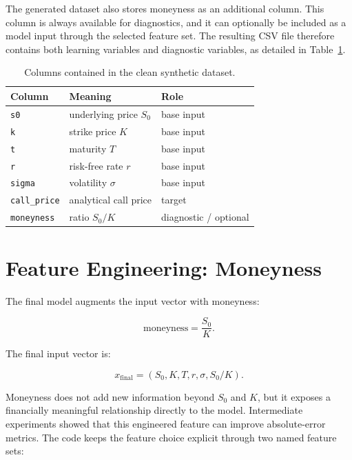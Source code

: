 The generated dataset also stores moneyness as an additional column.
This column is always available for diagnostics, and it can optionally be included as a model input through the selected feature set.
The resulting CSV file therefore contains both learning variables and diagnostic variables, as detailed in Table~\ref{tab:dataset-columns}.

\begin{table}[H]
    \centering
    \begin{tabular}{lll}
        \toprule
        Column & Meaning & Role \\
        \midrule
        \texttt{s0} & underlying price $S_0$ & base input \\
        \texttt{k} & strike price $K$ & base input \\
        \texttt{t} & maturity $T$ & base input \\
        \texttt{r} & risk-free rate $r$ & base input \\
        \texttt{sigma} & volatility $\sigma$ & base input \\
        \texttt{call\_price} & analytical call price & target \\
        \texttt{moneyness} & ratio $S_0/K$ & diagnostic / optional \\
        \bottomrule
    \end{tabular}
    \caption{Columns contained in the clean synthetic dataset.}
    \label{tab:dataset-columns}
\end{table}

\section{Feature Engineering: Moneyness}

The final model augments the input vector with moneyness:

\begin{equation}
    \mathrm{moneyness} = \frac{S_0}{K}.
\end{equation}

The final input vector is:

\begin{equation}
    x_{\mathrm{final}} = (S_0, K, T, r, \sigma, S_0/K).
\end{equation}

Moneyness does not add new information beyond $S_0$ and $K$, but it exposes a financially meaningful relationship directly to the model.
Intermediate experiments showed that this engineered feature can improve absolute-error metrics.
The code keeps the feature choice explicit through two named feature sets:

